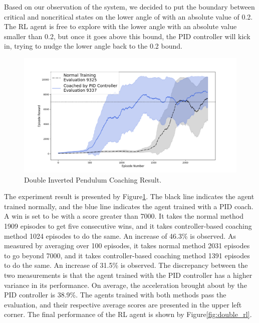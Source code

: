 \documentclass[smallextended]{svjour3}
\begin{document}
Based on our observation of the system, we decided to put the boundary between critical and noncritical states on the lower angle of with an absolute value of 0.2. The RL agent is free to explore with the lower angle with an absolute value smaller than 0.2, but once it goes above this bound, the PID controller will kick in, trying to nudge the lower angle back to the 0.2 bound.

\begin{figure}
     \centering
      \includegraphics[width=\textwidth]{double.png}
      \caption{Double Inverted Pendulum Coaching Result.}
      \label{fig:double_result}
\end{figure}

The experiment result is presented by Figure\ref{fig:double_result}. The black line indicates the agent trained normally, and the blue line indicates the agent trained with a PID coach. A win is set to be with a score greater than 7000. It takes the normal method 1909 episodes to get five consecutive wins, and it takes controller-based coaching method 1024 episodes to do the same. An increase of 46.3\% is observed. As measured by averaging over 100 episodes, it takes normal method 2031 episodes to go beyond 7000, and it takes controller-based coaching method 1391 episodes to do the same. An increase of 31.5\% is observed. The discrepancy between the two measurements is that the agent trained with the PID controller has a higher variance in its performance. On average, the acceleration brought about by the PID controller is 38.9\%. The agents trained with both methods pass the evaluation, and their respective average scores are presented in the upper left corner. The final performance of the RL agent is shown by Figure\ref{fig:double_rl}.
\end{document}
